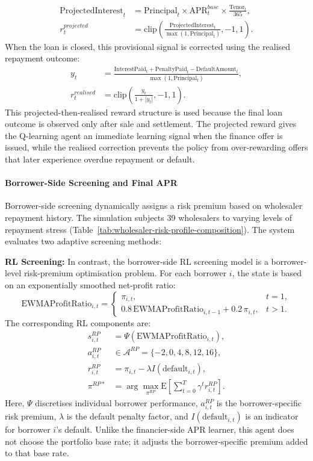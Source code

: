 \documentclass[12pt]{article}
\begin{document}
	\[
	\begin{aligned}
	\mathrm{ProjectedInterest}_t
	&= \mathrm{Principal}_t \times \mathrm{APR}^{base}_t \times \frac{\mathrm{Tenor}_t}{365},\\
	r_t^{projected}
	&= \mathrm{clip}\left(\frac{\mathrm{ProjectedInterest}_t}{\max(1,\mathrm{Principal}_t)},-1,1\right).
	\end{aligned}
	\]
	When the loan is closed, this provisional signal is corrected using the realised repayment outcome:
	\[
	\begin{aligned}
	y_t
	&=
	\frac{
		\mathrm{InterestPaid}_t+\mathrm{PenaltyPaid}_t-\mathrm{DefaultAmount}_t
	}{
		\max(1,\mathrm{Principal}_t)
	},\\
	r_t^{realised}
	&= \mathrm{clip}\left(\frac{y_t}{1+|y_t|},-1,1\right).
	\end{aligned}
	\]
	This projected-then-realised reward structure is used because the final loan outcome is observed only after sale and settlement. The projected reward gives the Q-learning agent an immediate learning signal when the finance offer is issued, while the realised correction prevents the policy from over-rewarding offers that later experience overdue repayment or default.
	
	\paragraph{Borrower-Side Screening and Final APR}
	
	Borrower-side screening dynamically assigns a risk premium based on wholesaler repayment history. The simulation subjects 39 wholesalers to varying levels of repayment stress (Table~\ref{tab:wholesaler-risk-profile-composition}). The system evaluates two adaptive screening methods:
	
	\textbf{RL Screening:} In contrast, the borrower-side RL screening model is a borrower-level risk-premium optimisation problem. For each borrower \(i\), the state is based on an exponentially smoothed net-profit ratio:
	\[
	\mathrm{EWMAProfitRatio}_{i,t} =
	\begin{cases}
		\pi_{i,t}, & t=1,\\
		0.8\,\mathrm{EWMAProfitRatio}_{i,t-1} + 0.2\,\pi_{i,t}, & t>1.
	\end{cases}
	\]
	The corresponding RL components are:
	\[
	\begin{aligned}
	s_{i,t}^{RP} &= \Psi\left(\mathrm{EWMAProfitRatio}_{i,t}\right),\\
	a_{i,t}^{RP} &\in \mathcal{A}^{RP}=\{-2,0,4,8,12,16\},\\
	r_{i,t}^{RP} &= \pi_{i,t}-\lambda I(\mathrm{default}_{i,t}),\\
	\pi^{RP*} &= \arg\max_{\pi^{RP}}\mathrm{E}\left[\sum_{t=0}^{T}\gamma^{t}r_{i,t}^{RP}\right].
	\end{aligned}
	\]
	Here, \(\Psi\) discretises individual borrower performance, \(a_{i,t}^{RP}\) is the borrower-specific risk premium, \(\lambda\) is the default penalty factor, and \(I(\mathrm{default}_{i,t})\) is an indicator for borrower \(i\)'s default. Unlike the financier-side APR learner, this agent does not choose the portfolio base rate; it adjusts the borrower-specific premium added to that base rate.
	
\end{document}
